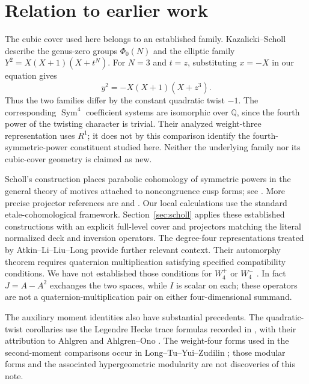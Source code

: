 \section{Relation to earlier work}\label{sec:related-work}

The cubic cover used here belongs to an established family.
Kazalicki--Scholl \cite[Sections~7--8]{KS} describe the genus-zero
groups $\Phi_0(N)$ and the elliptic family
$Y^2=X(X+1)(X+t^N)$. For $N=3$ and $t=z$, substituting $x=-X$
in our equation gives
\[
 y^2=-X(X+1)(X+z^3).
\]
Thus the two families differ by the constant quadratic twist $-1$.
The corresponding $\operatorname{Sym}^4$ coefficient systems are
isomorphic over $\mathbb Q$, since the fourth power of the twisting
character is trivial. Their analyzed weight-three representation uses
$R^1$; it does not by this comparison identify the fourth-symmetric-power constituent
studied here. Neither the underlying family nor its cubic-cover geometry
is claimed as new.

Scholl's construction places parabolic cohomology of symmetric powers
in the general theory of motives attached to noncongruence cusp forms;
see \cite[Introduction]{Scholl}. More precise projector references are
\cite[Sections~1.1--1.2]{SchollMotives} and
\cite[Sections~2.2--2.8 and 4.2--4.4]{SchollVanishing}.
Our local calculations use the standard
etale-cohomological framework. Section~\ref{sec:scholl} applies these
established constructions with an explicit full-level cover and projectors
matching the literal normalized deck and inversion operators. The degree-four
representations treated by Atkin--Li--Liu--Long \cite{ALLL} provide
further relevant context. Their automorphy theorem requires quaternion
multiplication satisfying specified compatibility conditions. We have
not established those conditions for $W_4^+$ or $W_4^-$
\cite[Definition~3.1.1 and Theorem~4.3.1]{ALLL}. In fact
$J=A-A^2$ exchanges the two spaces, while $I$ is scalar on each;
these operators are not a quaternion-multiplication pair on either
four-dimensional summand.

The auxiliary moment identities also have substantial precedents.
The quadratic-twist corollaries use the Legendre Hecke trace formulas
recorded in \cite[Theorem~2.3]{Grove}, with their attribution to Ahlgren
and Ahlgren--Ono \cite{Ahlgren,AhlgrenOno}. The weight-four forms used in the
second-moment comparisons occur in Long--Tu--Yui--Zudilin
\cite[Theorem~2 and Table~1]{LTYZ}; those modular forms and the
associated hypergeometric modularity are not discoveries of this note.

